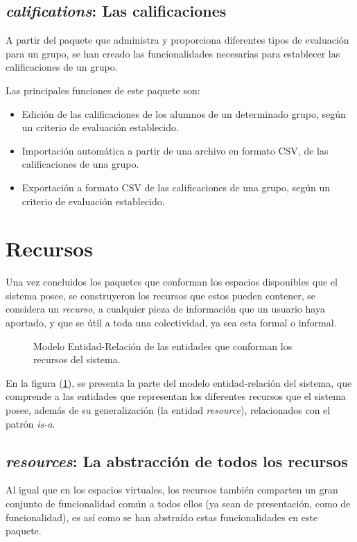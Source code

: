 \subsection{\emph{califications}: Las calificaciones}
A partir del paquete que administra y proporciona diferentes tipos de evaluación
para un grupo, se han creado las funcionalidades necesarias para establecer las
calificaciones de un grupo.

Las principales funciones de este paquete son:

\begin{itemize}
\item Edición de las calificaciones de los alumnos de un determinado grupo,
según un criterio de evaluación establecido.
\item Importación automática a partir de una archivo en formato CSV, de las
calificaciones de una grupo.
\item Exportación a formato CSV de las calificaciones de una grupo, según un
criterio de evaluación establecido.
\end{itemize}

\section{Recursos}
Una vez concluidos los paquetes que conforman los espacios disponibles que el
sistema posee, se construyeron los recursos que estos pueden contener, se
considera un \emph{recurso}, a cualquier pieza de información que un usuario
haya aportado, y que se útil a toda una colectividad, ya sea esta formal o
informal.

\begin{figure}
\centering

\caption{Modelo Entidad-Relación de las entidades que conforman los recursos
del sistema.}
\label{modelo4}
\end{figure}

En la figura (\ref{modelo4}), se presenta la parte del modelo entidad-relación
del sistema, que comprende a las entidades que representan los diferentes
recursos que el sistema posee, además de su generalización (la entidad
\emph{resource}), relacionados con el patrón \emph{is-a}.

\subsection{\emph{resources}: La abstracción de todos los recursos}
Al igual que en los espacios virtuales, los recursos también comparten un gran
conjunto de funcionalidad común a todos ellos (ya sean de presentación, como de
funcionalidad), es así como se han abstraído estas funcionalidades en este
paquete.

